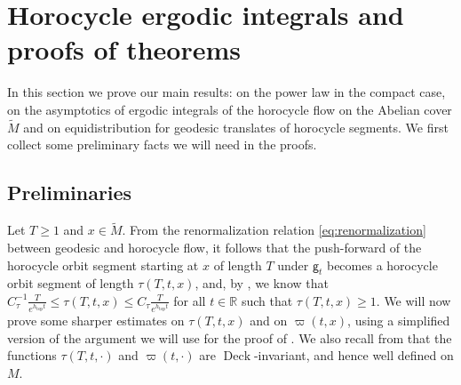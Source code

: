 \documentclass[11pt,letterpaper]{amsart}
\newcommand \R {{ \mathbb R}}
\newcommand \tM {{\widetilde M}}
\newcommand{\geo}{\mathsf{g}}
\DeclareMathOperator{\topp}{top}
\DeclareMathOperator{\Deck}{Deck}
\theoremstyle{definition}
\begin{document}



\section{Horocycle ergodic integrals and proofs of theorems}\label{sec:horocycle_integrals}

In this section we prove our main results:  on the power law in the compact case,  on the asymptotics of ergodic integrals of the horocycle flow on the Abelian cover $\widetilde{M}$ and  on equidistribution for geodesic translates of horocycle segments.
We first collect some preliminary facts we will need in the proofs.

\subsection{Preliminaries}
Let $T \geq 1$ and $x \in \tM$. From the renormalization relation \eqref{eq:renormalization} between geodesic and horocycle flow, it follows that the push-forward of the horocycle orbit segment starting at $x$ of length $T$ under $\geo_{t}$ becomes a horocycle orbit segment of length $\tau(T,t,x)$, and, by , we know that $C_\tau^{-1} \frac{T}{e^{h_{\topp}t}} \leq \tau(T,t,x) \leq C_\tau \frac{T}{e^{h_{\topp}t}}$ for all $t\in \R$ such that $\tau(T,t,x) \geq 1$. We will now prove some sharper estimates on $\tau(T,t,x)$  and on $\varpi(t,x)$, using a simplified version of the argument we will use for the proof of . We also recall from  that the functions $\tau(T,t,\cdot)$ and $\varpi(t,\cdot)$ are $\Deck$-invariant, and hence well defined on $M$.
\end{document}
